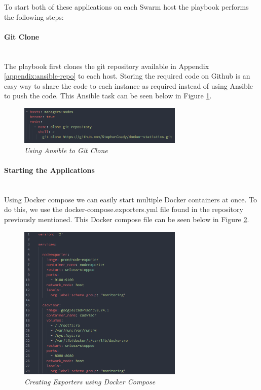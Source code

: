 To start both of these applications on each Swarm host the playbook performs the following steps:

\paragraph{Git Clone}\mbox{}\\
The playbook first clones the git repository available in Appendix \ref{appendix:ansible-repo} to each host. Storing the required code on Github is an easy way to share the code to each instance as required instead of using Ansible to push the code. This Ansible task can be seen below in Figure \ref{fig:git-clone}.

\begin{figure}[!h]
\centering
\includegraphics*[width=0.7\textwidth]{components/images/git-clone}
\caption{\em Using Ansible to Git Clone}
\label{fig:git-clone}
\end{figure}

\paragraph{Starting the Applications}\mbox{}\\
Using Docker compose we can easily start multiple Docker containers at once. To do this, we use the docker-compose.exporters.yml file found in the repository previously mentioned. This Docker compose file can be seen below in Figure \ref{fig:exporters-compose}.

\begin{figure}[!h]
\centering
\includegraphics*[width=0.7\textwidth]{components/images/exporters-compose}
\caption{\em Creating Exporters using Docker Compose}
\label{fig:exporters-compose}
\end{figure}

